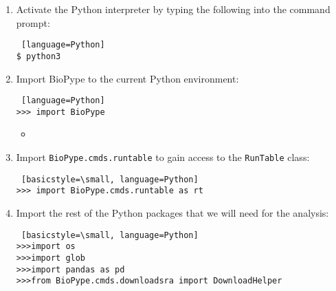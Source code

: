 \begin{enumerate}
                \begin{lstlisting} [language=Python]
$ cd <path_to_your_project>
$ pwd
                \end{lstlisting}
                        
            \item Activate the Python interpreter by typing the following into the command prompt:
                \begin{lstlisting} [language=Python]
$ python3
                \end{lstlisting}
            
            \item Import BioPype to the current Python environment:
                \begin{lstlisting} [language=Python]
>>> import BioPype
                \end{lstlisting}
                
                    \begin{itemize}
                    \item {}
                    \end{itemize}
                
            \item Import \verb|BioPype.cmds.runtable| to gain access to the \verb|RunTable| class:
                \begin{lstlisting} [basicstyle=\small, language=Python]
>>> import BioPype.cmds.runtable as rt
                \end{lstlisting}
                
            \item Import the rest of the Python packages that we will need for the analysis:
            \begin{lstlisting} [basicstyle=\small, language=Python]
>>>import os
>>>import glob
>>>import pandas as pd
>>>from BioPype.cmds.downloadsra import DownloadHelper
            \end{lstlisting}
                

\end{enumerate}
